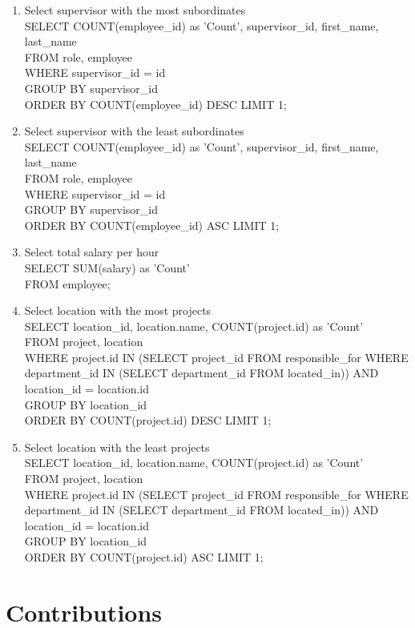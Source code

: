 \documentclass[11pt,letterpaper]{article}
\begin{document}
\begin{enumerate}
		\item Select supervisor with the most subordinates \\SELECT COUNT(employee\_id) as 'Count', supervisor\_id, first\_name, last\_name \\FROM role, employee \\WHERE supervisor\_id = id \\GROUP BY supervisor\_id \\ORDER BY COUNT(employee\_id) DESC LIMIT 1;
		\item Select supervisor with the least subordinates \\SELECT COUNT(employee\_id) as 'Count', supervisor\_id, first\_name, last\_name \\FROM role, employee \\WHERE supervisor\_id = id \\GROUP BY supervisor\_id \\ORDER BY COUNT(employee\_id) ASC LIMIT 1;
		\item Select total salary per hour \\SELECT SUM(salary) as 'Count' \\FROM employee;
		\item Select location with the most projects \\SELECT location\_id, location.name, COUNT(project.id) as 'Count' \\FROM project, location \\WHERE project.id IN (SELECT project\_id FROM responsible\_for WHERE department\_id IN (SELECT department\_id FROM located\_in)) AND location\_id = location.id \\GROUP BY location\_id \\ORDER BY COUNT(project.id) DESC LIMIT 1;
		\item Select location with the least projects \\SELECT location\_id, location.name, COUNT(project.id) as 'Count' \\FROM project, location \\WHERE project.id IN (SELECT project\_id FROM responsible\_for WHERE department\_id IN (SELECT department\_id FROM located\_in)) AND location\_id = location.id \\GROUP BY location\_id \\ORDER BY COUNT(project.id) ASC LIMIT 1;
	\end{enumerate}
	
\pagebreak

\section{Contributions}
\end{document}
